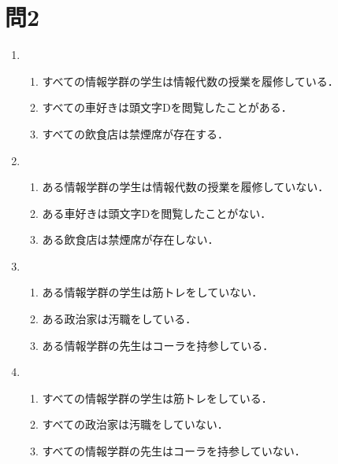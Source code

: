 \documentclass[uplatex]{jsarticle}
\begin{document}
\section{問2}
\renewcommand{\theenumi}{(\arabic{enumi})}
\begin{enumerate}
\vspace{12pt}

\item
	\begin{enumerate}
		\item すべての情報学群の学生は情報代数の授業を履修している．
		\item すべての車好きは頭文字Dを閲覧したことがある．
		\item すべての飲食店は禁煙席が存在する．
	\end{enumerate}

\vspace{12pt}
\item	
	\begin{enumerate}
		\item ある情報学群の学生は情報代数の授業を履修していない．
		\item ある車好きは頭文字Dを閲覧したことがない．
		\item ある飲食店は禁煙席が存在しない．
	\end{enumerate}

\vspace{12pt}
\item
	\begin{enumerate}
		\item ある情報学群の学生は筋トレをしていない．
		\item ある政治家は汚職をしている．
		\item ある情報学群の先生はコーラを持参している．
	\end{enumerate}

\vspace{12pt}
\item
	\begin{enumerate}
		\item すべての情報学群の学生は筋トレをしている．
		\item すべての政治家は汚職をしていない．
		\item すべての情報学群の先生はコーラを持参していない．
	\end{enumerate}
\end{enumerate}
\end{document}
